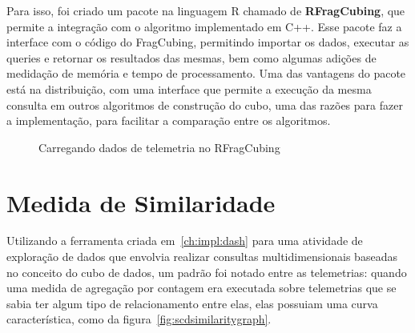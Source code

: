 Para isso, foi criado um pacote na linguagem R chamado de \textbf{RFragCubing}, que permite a integração com o algoritmo implementado em C++.
Esse pacote faz a interface com o código do FragCubing, permitindo importar os dados, executar as queries e retornar os resultados das mesmas, bem como algumas adições de medidação de memória e tempo de processamento.
Uma das vantagens do pacote está na distribuição, com uma interface que permite a execução da mesma consulta em outros algoritmos de construção do cubo, uma das razões para fazer a implementação, para facilitar a comparação entre os algoritmos.

\begin{figure}[ht]
	\caption{Carregando dados de telemetria no RFragCubing}
	\vspace{6mm}
	\begin{center}
	\end{center}
	\vspace{4mm}
	\legenda{}
	\label{fig:shinyrfrag}
\end{figure}

\section{Medida de Similaridade}
\label{ch:impl:similarity}

Utilizando a ferramenta criada em~\ref{ch:impl:dash} para uma atividade de exploração de dados que envolvia realizar consultas multidimensionais baseadas no conceito do cubo de dados, um padrão foi notado entre as telemetrias: quando uma medida de agregação por contagem era executada sobre telemetrias que se sabia ter algum tipo de relacionamento entre elas, elas possuiam uma curva característica, como da figura~\ref{fig:scdsimilaritygraph}.

